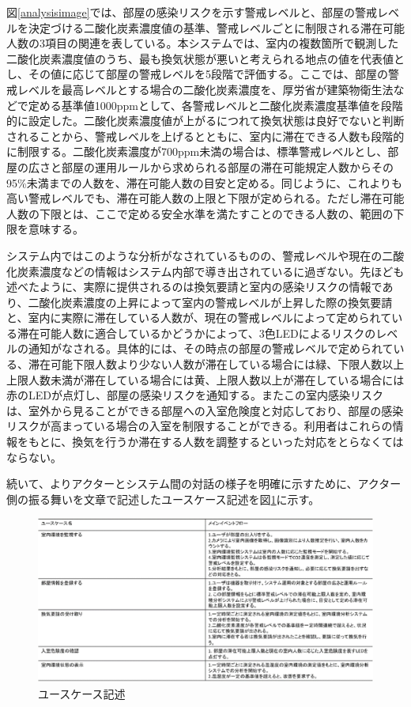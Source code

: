 図\ref{analysisimage}では、部屋の感染リスクを示す警戒レベルと、部屋の警戒レベルを決定づける二酸化炭素濃度値の基準、警戒レベルごとに制限される滞在可能人数の3項目の関連を表している。本システムでは、室内の複数箇所で観測した二酸化炭素濃度値のうち、最も換気状態が悪いと考えられる地点の値を代表値とし、その値に応じて部屋の警戒レベルを5段階で評価する。ここでは、部屋の警戒レベルを最高レベルとする場合の二酸化炭素濃度を、厚労省が建築物衛生法などで定める基準値1000ppmとして、各警戒レベルと二酸化炭素濃度基準値を段階的に設定した。二酸化炭素濃度値が上がるにつれて換気状態は良好でないと判断されることから、警戒レベルを上げるとともに、室内に滞在できる人数も段階的に制限する。二酸化炭素濃度が700ppm未満の場合は、標準警戒レベルとし、部屋の広さと部屋の運用ルールから求められる部屋の滞在可能規定人数からその95\%未満までの人数を、滞在可能人数の目安と定める。同じように、これよりも高い警戒レベルでも、滞在可能人数の上限と下限が定められる。ただし滞在可能人数の下限とは、ここで定める安全水準を満たすことのできる人数の、範囲の下限を意味する。

システム内ではこのような分析がなされているものの、警戒レベルや現在の二酸化炭素濃度などの情報はシステム内部で導き出されているに過ぎない。先ほども述べたように、実際に提供されるのは換気要請と室内の感染リスクの情報であり、二酸化炭素濃度の上昇によって室内の警戒レベルが上昇した際の換気要請と、室内に実際に滞在している人数が、現在の警戒レベルによって定められている滞在可能人数に適合しているかどうかによって、3色LEDによるリスクのレベルの通知がなされる。具体的には、その時点の部屋の警戒レベルで定められている、滞在可能下限人数より少ない人数が滞在している場合には緑、下限人数以上上限人数未満が滞在している場合には黄、上限人数以上が滞在している場合には赤のLEDが点灯し、部屋の感染リスクを通知する。またこの室内感染リスクは、室外から見ることができる部屋への入室危険度と対応しており、部屋の感染リスクが高まっている場合の入室を制限することができる。利用者はこれらの情報をもとに、換気を行うか滞在する人数を調整するといった対応をとらなくてはならない。

続いて、よりアクターとシステム間の対話の様子を明確に示すために、アクター側の振る舞いを文章で記述したユースケース記述を図\ref{usecasekijutu}に示す。

\begin{figure}[H]
	\centering
	\includegraphics[width=15cm]{usecasekijutu.eps}
	\caption{ユースケース記述}
	\label{usecasekijutu}
\end{figure}


